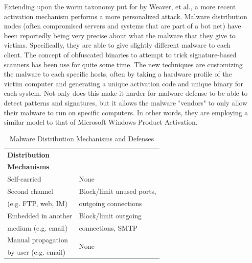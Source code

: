 Extending upon the worm taxonomy put for by Weaver, et al.\cite{worm_taxonomy_2003}, a more recent activation mechanism performs a more personalized attack. Malware distribution nodes (often compromised servers and systems that are part of a bot net) have been reportedly being very precise about what the malware that they give to victims. Specifically, they are able to give slightly different malware to each client. The concept of obfuscated binaries to attempt to trick signature-based scanners has been use for quite some time. The new techniques are customizing the malware to each specific hosts, often by taking a hardware profile of the victim computer and generating a unique activation code and unique binary for each system. Not only does this make it harder for malware defense to be able to detect patterns and signatures, but it allows the malware "vendors" to only allow their malware to run on specific computers. In other words, they are employing a similar model to that of Microsoft Windows Product Activation.

\begin{table}
\caption{Malware Distribution Mechanisms and Defenses}
\begin{center}
\begin{tabular}{|l|l|}
\hline
\bf Distribution & \bf \multirow{2}{*}{Defenses} \\
\bf Mechanisms & \\ \hline
Self-carried & None \\ \hline
Second channel & Block/limit unused ports, \\
(e.g. FTP, web, IM) & outgoing connections \\ \hline
Embedded in another & Block/limit outgoing \\
medium (e.g. email) & connections, SMTP \\ \hline
Manual propagation & \multirow{2}{*}{None} \\
by user (e.g. email) & \\ \hline
\end{tabular}
\end{center}
\end{table}

